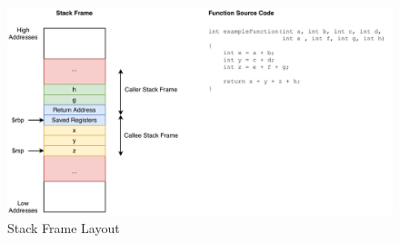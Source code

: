 \begin{figure}[htp!]
\centering
    \includegraphics[width=\textwidth]{assets/figures/chapter2/frame.pdf}
    \caption{Stack Frame Layout}
    \label{fig:stack-frame-layout}
\end{figure}
